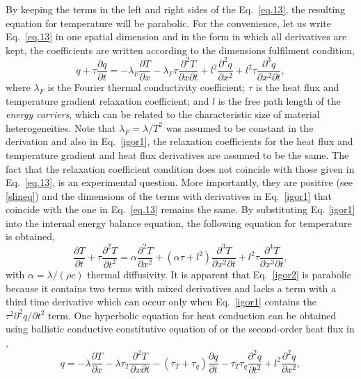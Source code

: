 \documentclass[sn-mathphys]{sn-jnl}%
\theoremstyle{thmstyleone}%
\theoremstyle{thmstyletwo}%
\theoremstyle{thmstylethree}%
\begin{document}
{By keeping the terms in the left and right sides of the Eq.~\eqref{eq.13}, the resulting equation for temperature will be parabolic. For the convenience, let us write Eq.~\eqref{eq.13} in one spatial dimension and in the form in which all derivatives are kept, the coefficients are written according to the dimensions fulfilment condition,
{
\begin{equation}
	\label{igor1}
	q +\tau \frac{\partial q}{\partial t} =
	-\lambda_F \frac{\partial T}{\partial x}-\lambda_F \tau \frac{\partial^2 T}{\partial x \partial t}+l^2 \frac{\partial^2 q}{\partial x^2}+l^2 \tau \frac{\partial^3 q}{\partial x^2 \partial t},
\end{equation}}
where $\lambda_F$ is the Fourier thermal conductivity coefficient; $\tau$ is the heat flux and temperature gradient relaxation coefficient; and $l$ is the free path length of the {\em energy carriers}, which can be related to the characteristic size of material heterogeneities. Note that  $\lambda_F = \lambda/T^2$ was assumed to be constant in the derivation and also in Eq.~\eqref{igor1}, the relaxation coefficients for the heat flux and temperature gradient and heat flux derivatives are assumed to be the same. The fact that the relaxation coefficient condition does not coincide with those given in Eq.~\eqref{eq.13}, is an experimental question. More importantly, they are positive (see \eqref{slineq}) and the dimensions of the terms with derivatives in Eq.~\eqref{igor1} that coincide with the one in Eq.~\eqref{eq.13} remains the same. By substituting Eq. \eqref{igor1} into the internal energy balance equation, the following equation for temperature
is obtained,
\begin{equation}
	\label{igor2}
	\frac{\partial T}{\partial t}+\tau\frac{\partial^2 T}{\partial t^2}=\alpha \frac{\partial^2 T}{\partial x^2}+(\alpha\tau+l^2)\frac{\partial^3 T}{\partial x^2 \partial t}+l^2\tau\frac{\partial^4 T}{\partial x^3 \partial t},
\end{equation}
with $\alpha=\lambda/(\rho c)$ thermal diffusivity. It is apparent that Eq.~\eqref{igor2} is parabolic because it contains two terms with mixed derivatives and lacks a term with a third time derivative which can occur only when  Eq.~\eqref{igor1} contains the $\tau^2\partial^2 q/\partial t^2$ term. One hyperbolic equation for heat conduction can be obtained using { ballistic conductive constitutive equation of \cite{KovVan15a} or the second-order heat flux in} \cite{Sobolev1997},
\begin{equation}
	\label{igor3}
	q=-\lambda\frac{\partial T}{\partial x}-\lambda \tau_T \frac{\partial^2 T}{\partial x \partial t}-(\tau_T+\tau_q)\frac{\partial q}{\partial t}-\tau_T\tau_q \frac{\partial^2 q}{\partial t^2}+l^2 \frac{\partial^2 q}{\partial x^2},

\end{equation}}
\end{document}
